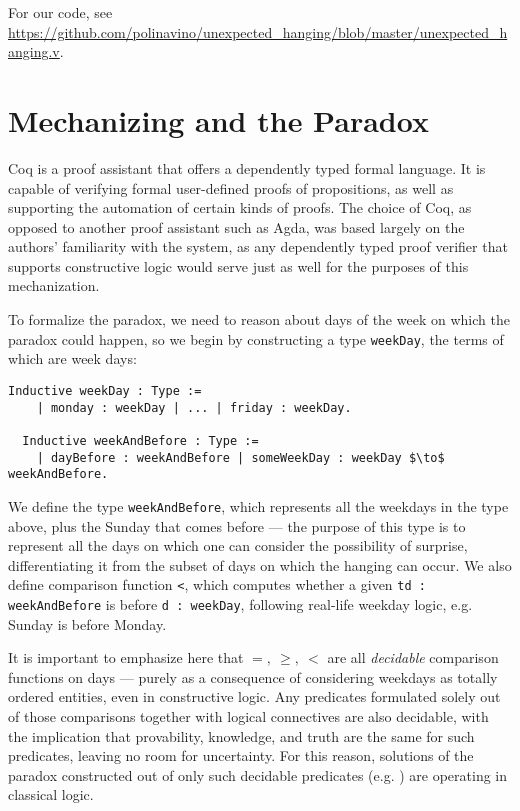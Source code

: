 \documentclass[runningheads]{llncs}
\begin{document}
  For our code, see \url{https://github.com/polinavino/unexpected_hanging/blob/master/unexpected_hanging.v}.

\section{Mechanizing and the Paradox}
\label{sec:form}

Coq is a proof assistant that offers a dependently typed formal language.
It is capable of verifying formal user-defined proofs of propositions, as well as supporting
the automation of certain kinds of proofs. The choice of Coq, as opposed to another
proof assistant such as Agda, was based largely on the authors' familiarity with the system,
as any dependently typed proof verifier that supports constructive logic
would serve just as well for the purposes of this mechanization.

To formalize the paradox, we need to reason about days of the week on which
the paradox could happen, so we
begin by constructing a type {\tt weekDay}, the terms of which are week days:

\begin{lstlisting}[mathescape=true]
  Inductive weekDay : Type :=
    | monday : weekDay | ... | friday : weekDay.

  Inductive weekAndBefore : Type :=
    | dayBefore : weekAndBefore | someWeekDay : weekDay $\to$ weekAndBefore.
\end{lstlisting}

We define the type {\tt weekAndBefore}, which represents all the weekdays in
the type above, plus the Sunday that comes before --- the purpose of this type is to
represent all the days on which one can consider the possibility of surprise,
differentiating it from the subset of days on which the hanging can occur. We
also define comparison function {\tt <}, which computes
whether a given {\tt td : weekAndBefore} is before {\tt d : weekDay},
following real-life weekday logic, e.g. Sunday is before Monday.

It is important to emphasize here that $=,~\geq,~<$ are all \emph{decidable}
comparison functions on days --- purely as a consequence of considering weekdays
as totally ordered entities, even in constructive logic. Any predicates
formulated solely out of those comparisons together with logical connectives are also decidable,
with the implication that provability, knowledge, and truth are the same for such predicates,
leaving no room for uncertainty.
For this reason, solutions of the paradox constructed out of only such decidable predicates (e.g. \cite{godelinconsistent})
are operating in classical logic.
\end{document}

